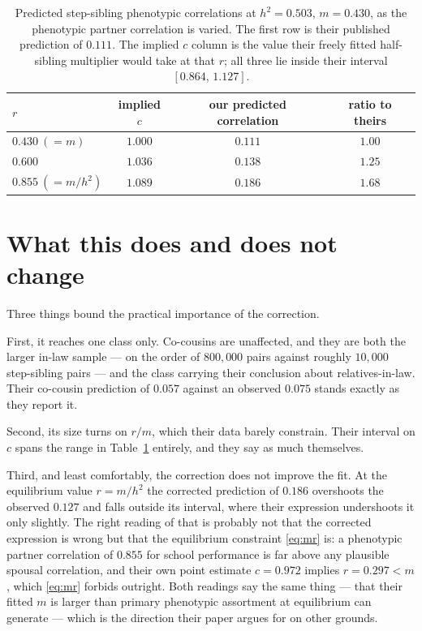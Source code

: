 \documentclass[12pt]{article}
\begin{document}
\begin{table}[H]
    \begin{floatcard}
    \renewcommand{\arraystretch}{1.5}
    \small
    \begin{tabular}{l|ccc}
        $r$ & implied $c$ & our predicted correlation & ratio to theirs \\
        \hline
        $0.430\ (=m)$    & $1.000$ & $0.111$ & $1.00$ \\
        $0.600$          & $1.036$ & $0.138$ & $1.25$ \\
        $0.855\ (=m/h^2)$& $1.089$ & $0.186$ & $1.68$ \\
    \end{tabular}
    \caption{%
        Predicted step-sibling phenotypic correlations at $h^2 = 0.503$, $m = 0.430$, as the phenotypic partner correlation is varied.
        The first row is their published prediction of $0.111$.
        The implied $c$ column is the value their freely fitted half-sibling multiplier would take at that $r$; all three lie inside their interval $[0.864,\,1.127]$.%
    }
    \label{tab:eftedal-numbers}
    \end{floatcard}
\end{table}

\section{What this does and does not change}

Three things bound the practical importance of the correction.

First, it reaches one class only.
Co-cousins are unaffected, and they are both the larger in-law sample --- on the order of $800{,}000$ pairs against roughly $10{,}000$ step-sibling pairs --- and the class carrying their conclusion about relatives-in-law.
Their co-cousin prediction of $0.057$ against an observed $0.075$ stands exactly as they report it.

Second, its size turns on $r/m$, which their data barely constrain.
Their interval on $c$ spans the range in Table~\ref{tab:eftedal-numbers} entirely, and they say as much themselves.

Third, and least comfortably, the correction does not improve the fit.
At the equilibrium value $r = m/h^2$ the corrected prediction of $0.186$ overshoots the observed $0.127$ and falls outside its interval, where their expression undershoots it only slightly.
The right reading of that is probably not that the corrected expression is wrong but that the equilibrium constraint \eqref{eq:mr} is: a phenotypic partner correlation of $0.855$ for school performance is far above any plausible spousal correlation, and their own point estimate $c = 0.972$ implies $r = 0.297 < m$, which \eqref{eq:mr} forbids outright.
Both readings say the same thing --- that their fitted $m$ is larger than primary phenotypic assortment at equilibrium can generate --- which is the direction their paper argues for on other grounds.
\end{document}
